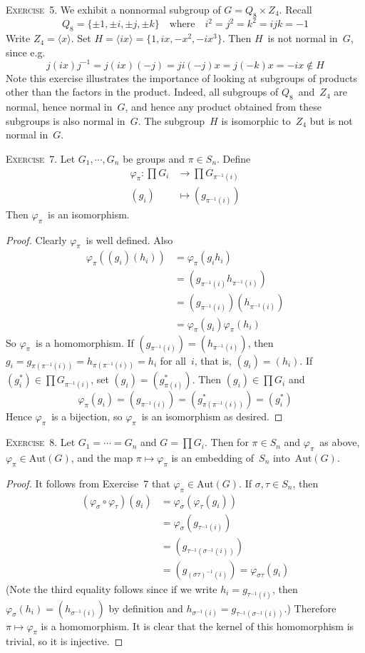 \documentclass[letterpaper]{article}
\newcommand{\exercise}[1]{\goodbreak\noindent\textsc{Exercise~{#1}.}}
\newcommand{\aut}{\mathrm{Aut}}
\newcommand{\gen}[1]{\langle{#1}\rangle}
\begin{document}
\exercise{5}
We exhibit a nonnormal subgroup of $G=Q_8\times Z_4$. Recall
$$Q_8=\{\pm1,\pm i,\pm j,\pm k\}\quad\text{where}\quad i^2=j^2=k^2=ijk=-1$$
Write $Z_4=\gen{x}$. Set $H=\gen{ix}=\{1,ix,-x^2,-ix^3\}$. Then $H$~is not normal in~$G$, since e.g.
$$j(ix)j^{-1}=j(ix)(-j)=ji(-j)x=j(-k)x=-ix\not\in H$$
Note this exercise illustrates the importance of looking at subgroups of products other than the factors in the product. Indeed, all subgroups of $Q_8$~and~$Z_4$ are normal, hence normal in~$G$, and hence any product obtained from these subgroups is also normal in~$G$. The subgroup~$H$ is isomorphic to~$Z_4$ but is not normal in~$G$.

\bigskip
\exercise{7}
Let $G_1,\cdots,G_n$ be groups and $\pi\in S_n$. Define
\begin{align*}
\varphi_{\pi}:\prod G_i&\to\prod G_{\pi^{-1}(i)}\\
					(g_i)&\mapsto(g_{\pi^{-1}(i)})
\end{align*}
Then $\varphi_{\pi}$~is an isomorphism.
\begin{proof}
Clearly $\varphi_{\pi}$~is well defined. Also
\begin{align*}
\varphi_{\pi}((g_i)(h_i))&=\varphi_{\pi}(g_ih_i)\\
							&=(g_{\pi^{-1}(i)}h_{\pi^{-1}(i)})\\
							&=(g_{\pi^{-1}(i)})(h_{\pi^{-1}(i)})\\
							&=\varphi_{\pi}(g_i)\varphi_{\pi}(h_i)
\end{align*}
So $\varphi_{\pi}$~is a homomorphism. If $(g_{\pi^{-1}(i)})=(h_{\pi^{-1}(i)})$, then $g_i=g_{\pi(\pi^{-1}(i))}=h_{\pi(\pi^{-1}(i))}=h_i$ for all~$i$, that is, $(g_i)=(h_i)$. If $(g_i^*)\in\prod G_{\pi^{-1}(i)}$, set $(g_i)=(g_{\pi(i)}^*)$. Then $(g_i)\in\prod G_i$ and
$$\varphi_{\pi}(g_i)=(g_{\pi^{-1}(i)})=(g_{\pi(\pi^{-1}(i))}^*)=(g_i^*)$$
Hence $\varphi_{\pi}$~is a bijection, so $\varphi_{\pi}$~is an isomorphism as desired.
\end{proof}

\exercise{8}
Let $G_1=\cdots=G_n$ and $G=\prod G_i$. Then for $\pi\in S_n$ and $\varphi_{\pi}$~as above, $\varphi_{\pi}\in\aut(G)$, and the map $\pi\mapsto\varphi_{\pi}$ is an embedding of~$S_n$ into~$\aut(G)$.
\begin{proof}
It follows from Exercise~7 that $\varphi_{\pi}\in\aut(G)$. If $\sigma,\tau\in S_n$, then
\begin{align*}
(\varphi_{\sigma}\circ\varphi_{\tau})(g_i)&=\varphi_{\sigma}(\varphi_{\tau}(g_i))\\
	&=\varphi_{\sigma}(g_{\tau^{-1}(i)})\\
	&=(g_{\tau^{-1}(\sigma^{-1}(i))})\\
	&=(g_{(\sigma\tau)^{-1}(i)})=\varphi_{\sigma\tau}(g_i)
\end{align*}
(Note the third equality follows since if we write $h_i=g_{\tau^{-1}(i)}$, then $\varphi_{\sigma}(h_i)=(h_{\sigma^{-1}(i)})$ by definition and $h_{\sigma^{-1}(i)}=g_{\tau^{-1}(\sigma^{-1}(i))}$.) Therefore $\pi\mapsto\varphi_{\pi}$ is a homomorphism. It is clear that the kernel of this homomorphism is trivial, so it is injective.
\end{proof}
\end{document}
